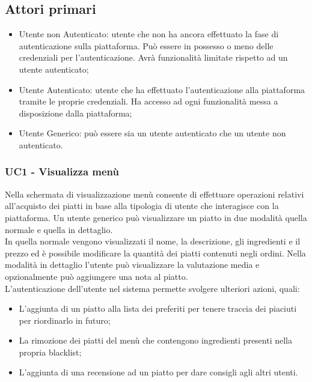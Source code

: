 \subsection{Attori primari}
\begin{itemize}
    \item Utente non Autenticato: utente che non ha ancora effettuato la fase di autenticazione sulla piattaforma. Può essere in possesso o meno delle credenziali per l'autenticazione. Avrà funzionalità limitate rispetto ad un utente autenticato;
    \item Utente Autenticato: utente che ha effettuato l'autenticazione alla piattaforma tramite le proprie credenziali. Ha accesso ad ogni funzionalità messa a disposizione dalla piattaforma;
    \item  Utente Generico: può essere sia un utente autenticato che un utente non autenticato.
\end{itemize}
\subsubsection{UC1 - Visualizza menù}
Nella schermata di visualizzazione menù consente di effettuare operazioni relativi all'acquisto dei piatti in base alla tipologia di utente che interagisce con la piattaforma.
Un utente generico può visualizzare un piatto in due modalità quella normale e quella in dettaglio.\\
In quella normale vengono visualizzati il nome, la descrizione, gli ingredienti e il prezzo ed è possibile modificare la quantità dei piatti contenuti negli ordini.
Nella modalità in dettaglio l'utente può visualizzare la valutazione media e opzionalmente può aggiungere una nota al piatto.\\
L'autenticazione dell'utente nel sistema permette svolgere ulteriori azioni, quali:\\
\begin{itemize}
    \item L'aggiunta di un piatto alla lista dei preferiti per tenere traccia dei piaciuti per riordinarlo in futuro;
    \item La rimozione dei piatti del menù che contengono ingredienti presenti nella propria blacklist;
    \item L'aggiunta di una recensione ad un piatto per dare consigli agli altri utenti.
\end{itemize} 

